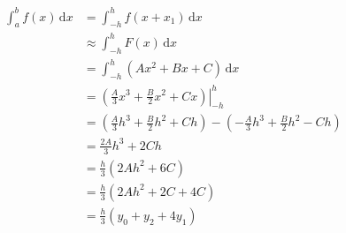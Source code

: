 \documentclass[12pt,a4paper]{article}
\newcommand{\dd}{\mathrm{d}}
\begin{document}
\[\begin{aligned}
    \int_a^bf(x)\,\dd x&=\int_{-h}^hf(x+x_1)\,\dd x\\
    &\approx\int_{-h}^hF(x)\,\dd x\\
    &=\int_{-h}^h\left(Ax^2+Bx+C\right)\,\dd x\\
    &=\left.\left(\frac A3x^3+\frac B2x^2+Cx\right)\right|_{-h}^h\\
    &=\left(\frac A3h^3+\frac B2h^2+Ch\right)-\left(-\frac A3h^3+\frac B2h^2-Ch\right)\\
    &=\frac{2A}3h^3+2Ch\\
    &=\frac h3\left(2Ah^2+6C\right)\\
    &=\frac h3\left(2Ah^2+2C+4C\right)\\
    &=\frac h3\left(y_0+y_2+4y_1\right)\\
\end{aligned}\]
\end{document}
